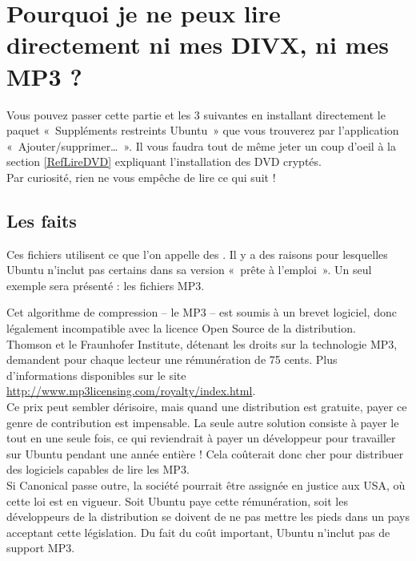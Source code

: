 \section{Pourquoi je ne peux lire directement ni mes DIVX, ni mes MP3 ?}
Vous pouvez passer cette partie et les 3 suivantes en installant directement le paquet «~Suppléments restreints Ubuntu~» que vous trouverez par l'application «~Ajouter/supprimer\dots{}~». Il vous faudra tout de même jeter un coup d'oeil à la section \ref{RefLireDVD} expliquant l'installation des DVD cryptés.\\
Par curiosité, rien ne vous empêche de lire ce qui suit !
\subsection{Les faits}
Ces fichiers utilisent ce que l'on appelle des . Il y a des raisons pour lesquelles Ubuntu n'inclut pas certains   dans sa version «~prête à l'emploi~». Un seul exemple sera présenté : les fichiers MP3. \par
Cet algorithme de compression -- le MP3 -- est soumis à un brevet logiciel, donc légalement incompatible avec la licence Open Source de la distribution.\\
Thomson et le Fraunhofer Institute, détenant les droits sur la technologie MP3, demandent pour chaque lecteur une rémunération de 75 cents. Plus d'informations disponibles sur le site \url{http://www.mp3licensing.com/royalty/index.html}.\\
Ce prix peut sembler dérisoire, mais quand une distribution est gratuite, payer ce genre de contribution est impensable. La seule autre solution consiste à payer le tout en une seule fois, ce qui reviendrait à payer un développeur pour travailler sur Ubuntu pendant une année entière ! Cela coûterait donc cher pour distribuer des logiciels capables de lire les MP3.\\
Si Canonical passe outre, la société pourrait être assignée en justice aux USA, où cette loi est en vigueur. Soit Ubuntu paye cette rémunération, soit les développeurs de la distribution se doivent de ne pas mettre les pieds dans un pays acceptant cette législation. Du fait du coût important, Ubuntu n'inclut pas de support MP3.\par
